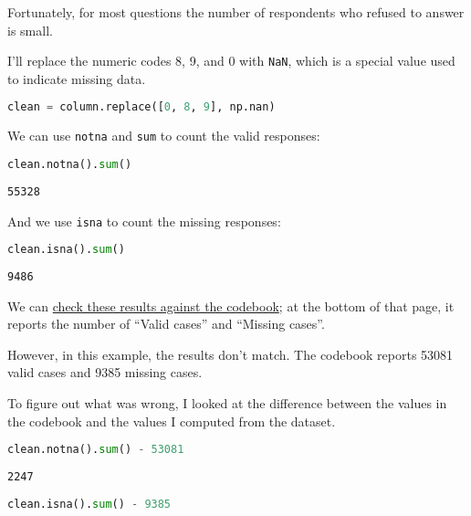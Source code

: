 Fortunately, for most questions the number of respondents who refused to
answer is small.

I'll replace the numeric codes 8, 9, and 0 with
\passthrough{\lstinline!NaN!}, which is a special value used to indicate
missing data.

\begin{lstlisting}[language=Python,style=source]
clean = column.replace([0, 8, 9], np.nan)
\end{lstlisting}

We can use \passthrough{\lstinline!notna!} and
\passthrough{\lstinline!sum!} to count the valid responses:

\begin{lstlisting}[language=Python,style=source]
clean.notna().sum()
\end{lstlisting}

\begin{lstlisting}[style=output]
55328
\end{lstlisting}

And we use \passthrough{\lstinline!isna!} to count the missing
responses:

\begin{lstlisting}[language=Python,style=source]
clean.isna().sum()
\end{lstlisting}

\begin{lstlisting}[style=output]
9486
\end{lstlisting}

We can
\href{https://gssdataexplorer.norc.org/projects/52787/variables/178/vshow}{check
these results against the codebook}; at the bottom of that page, it
reports the number of ``Valid cases'' and ``Missing cases''.

However, in this example, the results don't match. The codebook reports
53081 valid cases and 9385 missing cases.

To figure out what was wrong, I looked at the difference between the
values in the codebook and the values I computed from the dataset.

\begin{lstlisting}[language=Python,style=source]
clean.notna().sum() - 53081
\end{lstlisting}

\begin{lstlisting}[style=output]
2247
\end{lstlisting}

\begin{lstlisting}[language=Python,style=source]
clean.isna().sum() - 9385
\end{lstlisting}

